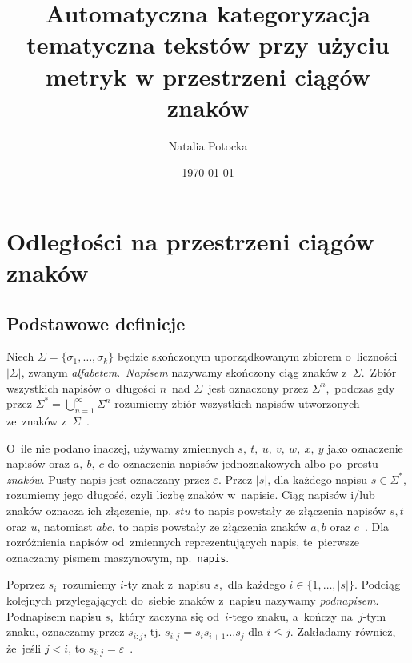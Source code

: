 \documentclass{praca1}
\author{Natalia Potocka}
\title{Automatyczna kategoryzacja tematyczna tekstów przy użyciu metryk w przestrzeni ciągów znaków}
\date{\today}
\begin{document}
%
%
%

\chapter{Odległości na przestrzeni ciągów znaków}\label{metryki-na-przestrzeni-ciagow-znakow}

\section{Podstawowe definicje}


\begin{definition}
Niech  $\Sigma = \{\sigma_1, \ldots, \sigma_k\}$ będzie skończonym uporządkowanym zbiorem o~liczności $|\Sigma|$, zwanym \emph{alfabetem}.~\emph{Napisem} nazywamy skończony ciąg znaków z~$\Sigma$.~Zbiór wszystkich napisów o~długości $n$~nad $\Sigma$~jest oznaczony przez $\Sigma^n$,~podczas gdy przez $\Sigma^* = \bigcup_{n=1}^{\infty}\Sigma^n$ rozumiemy zbiór wszystkich napisów utworzonych ze~znaków z~$\Sigma$~\cite{Boytsov2011:indexingmethods}.
\end{definition}

O~ile nie podano inaczej, używamy zmiennych $s,\ t,\ u,\ v,\ w,\ x,\ y$ jako oznaczenie napisów oraz $a,\ b,\ c$ do oznaczenia napisów jednoznakowych albo po~prostu \emph{znaków}. Pusty napis jest oznaczany przez $\varepsilon$. Przez $|s|$, dla każdego napisu $s \in \Sigma^*$, rozumiemy jego długość, czyli liczbę znaków w~napisie. Ciąg napisów i/lub znaków oznacza ich złączenie, np. $stu$ to napis powstały ze złączenia napisów $s, t$ oraz $u$, natomiast $abc$, to napis powstały ze złączenia znaków $a, b$ oraz $c$~\cite{Boytsov2011:indexingmethods}. Dla rozróżnienia napisów od~zmiennych reprezentujących napis, te~pierwsze oznaczamy pismem maszynowym, np.~\verb|napis|.

Poprzez $s_i$~rozumiemy $i$-ty znak z~napisu $s$,~dla każdego $i \in \{1,\ldots,|s|\}$. Podciąg kolejnych przylegających do~siebie znaków z~napisu nazywamy \emph{podnapisem}. Podnapisem napisu $s$,~który zaczyna się od~$i$-tego znaku, a~kończy na~$j$-tym znaku, oznaczamy przez $s_{i:j}$, tj. $s_{i:j} = s_is_{i+1}\ldots s_j$ dla $i \leq j$. Zakładamy również, że~jeśli $j < i$, to $s_{i:j} = \varepsilon$~\cite{Boytsov2011:indexingmethods,Loo2014:stringdist}.
\end{document}
